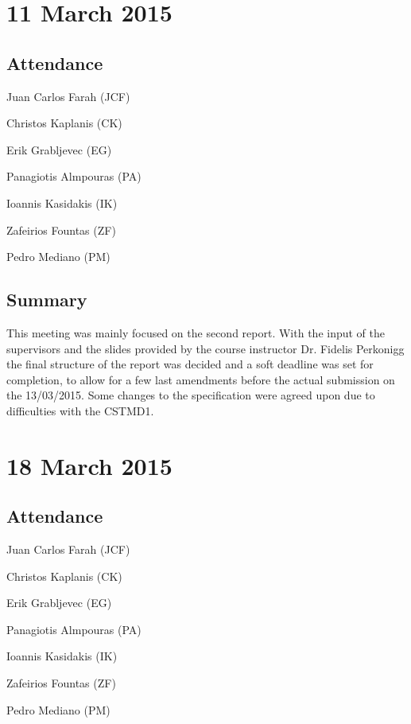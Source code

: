 \documentclass[a4paper,11pt]{article}
\begin{document}
\maketitle
\section*{11 March 2015}
\subsection*{Attendance}
\begin{compactenum}
\item Juan Carlos Farah (JCF)
\item Christos Kaplanis (CK)
\item Erik Grabljevec (EG)
\item Panagiotis Almpouras (PA)
\item Ioannis Kasidakis (IK)
\item Zafeirios Fountas (ZF)
\item Pedro Mediano (PM)
\end{compactenum}

\subsection*{Summary}
This meeting was mainly focused on the second report. With the input of the supervisors and the slides provided by the course instructor Dr. Fidelis Perkonigg the final structure of the report was decided and a soft deadline was set for completion, to allow for a few last amendments before the actual submission on the 13/03/2015. Some changes to the specification were agreed upon due to difficulties with the CSTMD1.

\maketitle
\section*{18 March 2015}
\subsection*{Attendance}
\begin{compactenum}
\item Juan Carlos Farah (JCF)
\item Christos Kaplanis (CK)
\item Erik Grabljevec (EG)
\item Panagiotis Almpouras (PA)
\item Ioannis Kasidakis (IK)
\item Zafeirios Fountas (ZF)
\item Pedro Mediano (PM)
\end{compactenum}
\end{document}
